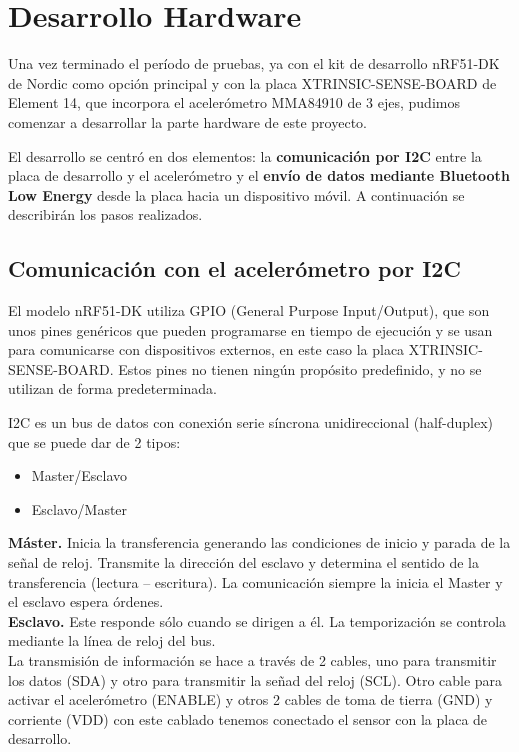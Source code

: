 \cleardoublepage

\chapter{Desarrollo Hardware}
\label{makereference5}

Una vez terminado el período de pruebas, ya con el kit de desarrollo nRF51-DK de Nordic como opción principal y con la placa XTRINSIC-SENSE-BOARD de Element 14, que incorpora el acelerómetro MMA84910 de 3 ejes, pudimos comenzar a desarrollar la parte hardware de este proyecto.

El desarrollo se centró en dos elementos: la \textbf{comunicación por I2C} entre la placa de desarrollo y el acelerómetro y el \textbf{envío de datos mediante Bluetooth Low Energy} desde la placa hacia un dispositivo móvil. A continuación se describirán los pasos realizados.

\section{Comunicación con el acelerómetro por I2C}
\label{makereference5.1}

El modelo nRF51-DK utiliza GPIO (General Purpose Input/Output), que son unos pines genéricos que pueden programarse en tiempo de ejecución y se usan para comunicarse con dispositivos externos, en este caso la placa XTRINSIC-SENSE-BOARD. Estos pines no tienen ningún propósito predefinido, y no se utilizan de forma predeterminada. %

I2C es un bus de datos con conexión serie síncrona unidireccional (half-duplex) que se puede dar de 2 tipos:
\begin{itemize}
	\item Master/Esclavo
	\item Esclavo/Master
\end{itemize}

\textbf{Máster.} Inicia la transferencia generando las condiciones de inicio y parada de la señal de reloj. Transmite la dirección del esclavo y determina el sentido de la transferencia (lectura –
escritura). La comunicación siempre la inicia el Master y el esclavo espera órdenes.\\

\textbf{Esclavo.} Este responde sólo cuando se dirigen a él. La temporización se controla mediante la línea de reloj del bus.\\

La transmisión de información se hace a través de 2 cables, uno para transmitir los datos (SDA) y otro para transmitir la señad del reloj (SCL). Otro cable para activar el acelerómetro (ENABLE) y otros 2 cables de toma de tierra (GND) y corriente (VDD) con este cablado tenemos conectado el sensor con la placa de desarrollo.

